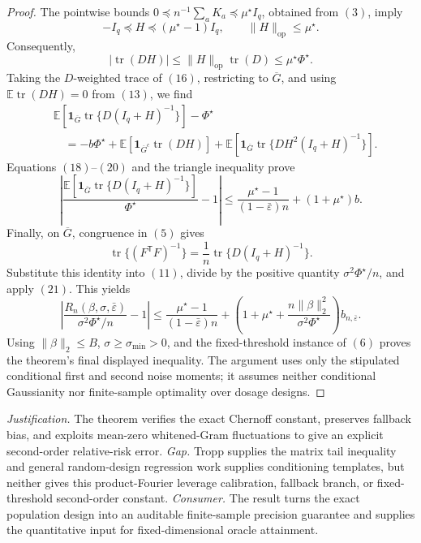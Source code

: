 \documentclass{article}
\begin{document}
\begin{proof}
The pointwise bounds \(0\preceq n^{-1}\sum_aK_a\preceq\mu^\star I_q\), obtained from \((3)\), imply
\[
 -I_q\preceq H\preceq(\mu^\star-1)I_q,
 \qquad
 \|H\|_{\mathrm{op}}\le\mu^\star.
\]
Consequently,
\[
 |\operatorname{tr}(DH)|
 \le\|H\|_{\mathrm{op}}\operatorname{tr}(D)
 \le\mu^\star\Phi^\star.
 \tag{19}
\]
Taking the \(D\)-weighted trace of \((16)\), restricting to \(\overline G\), and using \(\mathbb E\operatorname{tr}(DH)=0\) from \((13)\), we find
\[
\begin{aligned}
 &\mathbb E\!\left[\mathbf 1_{\overline G}
 \operatorname{tr}\{D(I_q+H)^{-1}\}\right]-\Phi^\star\\
 &\quad=-b\Phi^\star
 +\mathbb E\!\left[\mathbf 1_{\overline G^c}\operatorname{tr}(DH)\right]
 +\mathbb E\!\left[\mathbf 1_{\overline G}
 \operatorname{tr}\{DH^2(I_q+H)^{-1}\}\right].
\end{aligned}
 \tag{20}
\]
Equations \((18)\)--\((20)\) and the triangle inequality prove
\[
 \left|
 \frac{\mathbb E[\mathbf 1_{\overline G}
 \operatorname{tr}\{D(I_q+H)^{-1}\}]}{\Phi^\star}-1
 \right|
 \le\frac{\mu^\star-1}{(1-\bar\varepsilon)n}
 +(1+\mu^\star)b.
 \tag{21}
\]
Finally, on \(\overline G\), congruence in \((5)\) gives
\[
 \operatorname{tr}\{(F^{\mathsf T}F)^{-1}\}
 =\frac1n\operatorname{tr}\{D(I_q+H)^{-1}\}.
\]
Substitute this identity into \((11)\), divide by the positive quantity \(\sigma^2\Phi^\star/n\), and apply \((21)\).  This yields
\[
 \left|
 \frac{R_n(\beta,\sigma,\bar\varepsilon)}{\sigma^2\Phi^\star/n}-1
 \right|
 \le\frac{\mu^\star-1}{(1-\bar\varepsilon)n}
 +\left(1+\mu^\star+
 \frac{n\|\beta\|_2^2}{\sigma^2\Phi^\star}\right)b_{n,\bar\varepsilon}.
\]
Using \(\|\beta\|_2\le B\), \(\sigma\ge\sigma_{\min}>0\), and the fixed-threshold instance of \((6)\) proves the theorem's final displayed inequality.  The argument uses only the stipulated conditional first and second noise moments; it assumes neither conditional Gaussianity nor finite-sample optimality over dosage designs.
\end{proof}
\par\smallskip\noindent \textit{Justification.} The theorem verifies the exact Chernoff constant, preserves fallback bias, and exploits mean-zero whitened-Gram fluctuations to give an explicit second-order relative-risk error. \textit{Gap.} Tropp supplies the matrix tail inequality and general random-design regression work supplies conditioning templates, but neither gives this product-Fourier leverage calibration, fallback branch, or fixed-threshold second-order constant. \textit{Consumer.} The result turns the exact population design into an auditable finite-sample precision guarantee and supplies the quantitative input for fixed-dimensional oracle attainment.
\end{document}
